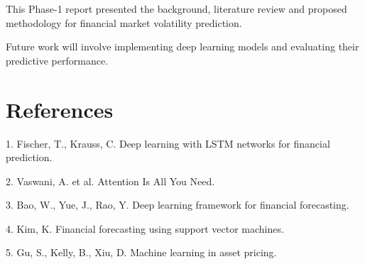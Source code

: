 \documentclass[12pt]{article}
\begin{document}
This Phase-1 report presented the background, literature review and proposed methodology for financial market volatility prediction.

Future work will involve implementing deep learning models and evaluating their predictive performance.


\newpage
\section*{References}

1. Fischer, T., Krauss, C. Deep learning with LSTM networks for financial prediction.

2. Vaswani, A. et al. Attention Is All You Need.

3. Bao, W., Yue, J., Rao, Y. Deep learning framework for financial forecasting.

4. Kim, K. Financial forecasting using support vector machines.

5. Gu, S., Kelly, B., Xiu, D. Machine learning in asset pricing.
\end{document}
